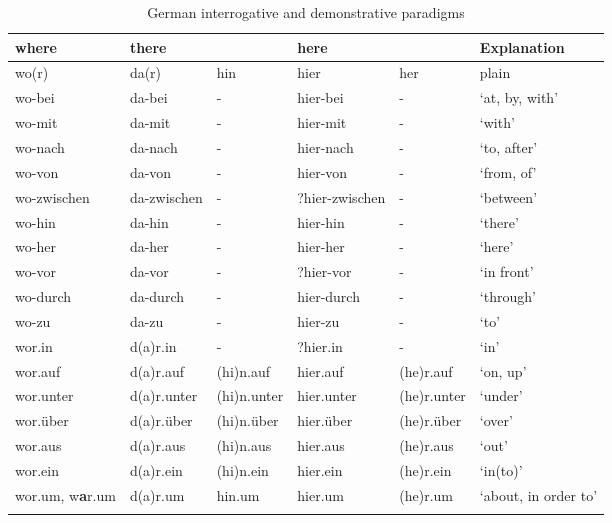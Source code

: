 \begin{table}
\caption{German interrogative and demonstrative paradigms}
\label{tab:indo:9}
\small
\begin{tabularx}{\textwidth}{ll@{}ll@{}lQ}
\lsptoprule

\textbf{where} & \textbf{there} &  & \textbf{here} &  & \textbf{Explanation}\\
\midrule
wo(r) & da(r) & hin & hier & her & plain\\
wo-bei & da-bei & - & hier-bei & - & ‘at, by, with’\\
wo-mit & da-mit & - & hier-mit & - & ‘with’\\
wo-nach & da-nach & - & hier-nach & - & ‘to, after’\\
wo-von & da-von & - & hier-von & - & ‘from, of’\\
wo-zwischen & da-zwischen & - & ?hier-zwischen & - & ‘between’\\
wo-hin & da-hin & - & hier-hin & - & ‘there’\\
wo-her & da-her & - & hier-her & - & ‘here’\\
wo-vor & da-vor & - & ?hier-vor & - & ‘in front’\\
wo-durch & da-durch & - & hier-durch & - & ‘through’\\
wo-zu & da-zu & - & hier-zu & - & ‘to’\\
wor.in & d(a)r.in & - & ?hier.in & - & ‘in’\\
wor.auf & d(a)r.auf & (hi)n.auf & hier.auf & (he)r.auf & ‘on, up’\\
wor.unter & d(a)r.unter & (hi)n.unter & hier.unter & (he)r.unter & ‘under’\\
wor.über & d(a)r.über & (hi)n.über & hier.über & (he)r.über & ‘over’\\
wor.aus & d(a)r.aus & (hi)n.aus & hier.aus & (he)r.aus & ‘out’\\
wor.ein & d(a)r.ein & (hi)n.ein & hier.ein & (he)r.ein & ‘in(to)’\\
wor.um, w\textbf{a}r.um & d(a)r.um & hin.um & hier.um & (he)r.um & ‘about, in order to’\\
\lspbottomrule
\end{tabularx}
\end{table}


